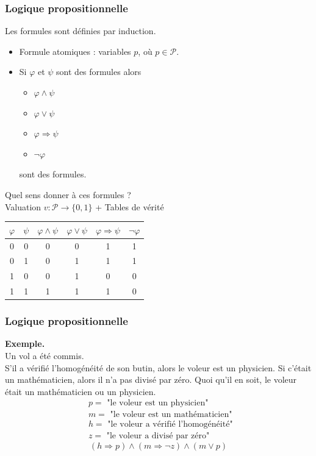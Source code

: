 \documentclass{beamer}
\newcommand{\itemz}{\item[$\triangleright$]}
\begin{document}
\begin{frame}
\frametitle{Logique propositionnelle}
Les formules sont définies par induction.
\pause
\begin{itemize}
\itemz Formule atomiques : variables $p$, où $p \in \mathcal{P}$.
\pause
\itemz Si $\varphi$ et $\psi$ sont des formules alors
\pause
\begin{itemize}
\itemz $\varphi \wedge \psi$
\pause
\itemz $\varphi \vee \psi$
\pause
\itemz $\varphi \Rightarrow \psi$
\pause
\itemz $\neg \varphi$
\end{itemize}
sont des formules.
\end{itemize}
\pause
Quel sens donner à ces formules ? \\
Valuation $v : \mathcal{P} \to \{0,1\}$ + Tables de vérité
\pause
\begin{center}
\begin{tabular}{|c|c|c|c|c|c|}
  \hline
  $\varphi$ & $\psi$ & $\varphi \wedge \psi$ & $\varphi \vee \psi$ & $\varphi \Rightarrow \psi$ & $\neg \varphi$ \\
  \hline
  0 & 0 & 0 & 0 & 1 & 1 \\ 
  0 & 1 & 0 & 1 & 1 & 1 \\
  1 & 0 & 0 & 1 & 0 & 0 \\
  1 & 1 & 1 & 1 & 1 & 0 \\
  \hline
\end{tabular}
\end{center}
\end{frame}

\begin{frame}
\frametitle{Logique propositionnelle}
\textbf{Exemple.}\\
Un vol a été commis.\\
S'il a vérifié l'homogénéité de son butin, alors le voleur est un physicien. Si c'était un mathématicien, alors il n'a pas divisé par zéro. Quoi qu'il en soit, le voleur était un mathématicien ou un physicien. \pause
\begin{align*}
& p = \text{ "le voleur est un physicien" } \\
& m = \text{ "le voleur est un mathématicien" } \\
& h = \text{ "le voleur a vérifié l'homogénéité" } \\
& z = \text{ "le voleur a divisé par zéro" }
\end{align*}
\pause
\[ (h \Rightarrow p) \wedge (m \Rightarrow \neg z) \wedge (m \vee p) \]
\end{frame}
\end{document}
